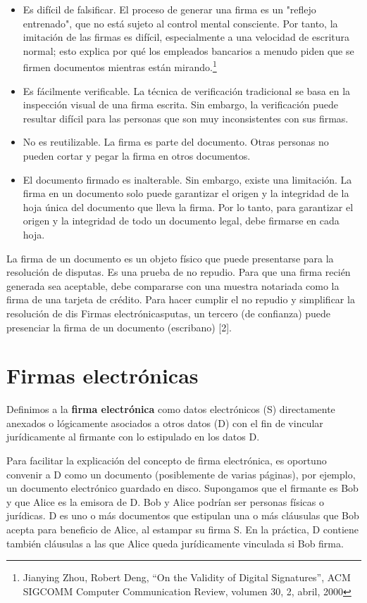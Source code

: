 \documentclass[12pt]{report} %
\begin{document}
\begin{itemize}
\begin{itemize}
    \item Es difícil de falsificar. El proceso de generar una firma es un "reflejo entrenado", que no está sujeto al control mental consciente. Por tanto, la imitación de las firmas es difícil, especialmente a una velocidad de escritura normal; esto explica por qué los empleados bancarios a menudo piden que se firmen documentos mientras están mirando.\footnote{Jianying Zhou, Robert Deng, “On the Validity of Digital Signatures”, ACM SIGCOMM Computer Communication Review, volumen 30, 2, abril, 2000} 
    \item Es fácilmente verificable. La técnica de verificación tradicional se basa en la inspección visual de una firma escrita. Sin embargo, la verificación puede resultar difícil para las personas que son muy inconsistentes con sus firmas.
    \item No es reutilizable. La firma es parte del documento. Otras personas no pueden cortar y pegar la firma en otros documentos.
    \item El documento firmado es inalterable. Sin embargo, existe una limitación. La firma en un documento solo puede garantizar el origen y la integridad de la hoja única del documento que lleva la firma. Por lo tanto, para garantizar el origen y la integridad de todo un documento legal, debe firmarse en cada hoja. 

\end{itemize}

La firma de un documento es un objeto físico que puede presentarse para la resolución de disputas. Es una prueba de no repudio. Para que una firma recién generada sea aceptable, debe compararse con una muestra notariada como la firma de una tarjeta de crédito. Para hacer cumplir el no repudio y simplificar la resolución de dis	Firmas electrónicasputas, un tercero (de confianza) puede presenciar la firma de un documento (escribano) [2].

\section{	Firmas electrónicas}

Definimos a la \textbf{firma electrónica} como datos electrónicos (S) directamente anexados o lógicamente asociados a otros datos (D) con el fin de vincular jurídicamente al firmante con lo estipulado en los datos D.

Para facilitar la explicación del concepto de firma electrónica, es oportuno convenir a D como un documento (posiblemente de varias páginas), por ejemplo, un documento electrónico guardado en disco. Supongamos que el firmante es Bob y que Alice es la emisora de D. Bob y Alice podrían ser personas físicas o jurídicas. D es uno o más documentos que estipulan una o más cláusulas que Bob acepta para beneficio de Alice, al estampar su firma S. En la práctica, D contiene también cláusulas a las que Alice queda jurídicamente vinculada si Bob firma.


\end{itemize}
\end{document}
